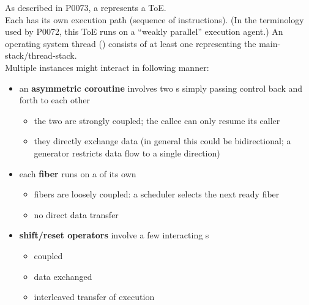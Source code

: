 \label{appendixb}
As described in P0073\cite{P0073}, a \ectx represents a ToE.\\
Each \ectx has its own execution path (sequence of instructions). (In
the terminology used by P0072\cite{P0072}, this ToE runs on a
``weakly parallel'' execution agent.) An operating system thread
() consists of at least one \ectx representing the
main-stack/thread-stack.\\
Multiple \ectx instances might interact in following manner:
\begin{itemize}
\item an {\bfseries asymmetric coroutine} involves two \ectx s simply passing
      control back and forth to each other
    \begin{itemize}
        \item the two are strongly coupled; the callee \ectx can only resume
            its caller
        \item they directly exchange data (in general this could be
            bidirectional; a generator restricts data flow to a single
            direction)
    \end{itemize}
\item each {\bfseries fiber} runs on a \ectx of its own
    \begin{itemize}
        \item fibers are loosely coupled: a scheduler selects the next ready fiber
        \item no direct data transfer
    \end{itemize}
\item {\bfseries shift/reset operators} involve a few interacting \ectx s
    \begin{itemize}
        \item coupled
        \item data exchanged
        \item interleaved transfer of execution
    \end{itemize}
\end{itemize}
